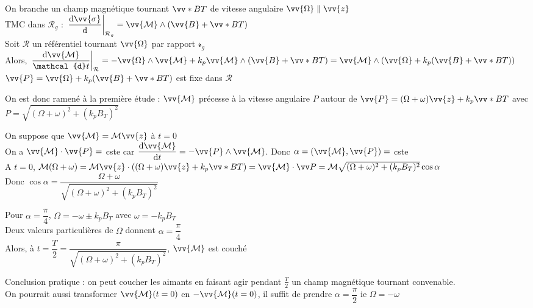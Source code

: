 ﻿\documentclass[a4paper]{article}
\begin{document}
On branche un champ magnétique tournant $\vv*{B}{T}$ de vitesse angulaire $\vv{\Omega}\parallel\vv{z}$\\
TMC dans $\mathcal{R}_g$ : $\left.\dfrac{\mathrm{d}\vv{\sigma}}{\mathrm{d}}\right|_{\mathcal{R}_g}=\vv{\mathcal{M}}\wedge(\vv{B}+\vv*{B}{T})$\\
Soit $\mathcal{R}$ un référentiel tournant $\vv{\Omega}$ par rapport $\mathcal{r}_g$\\
Alors, $\left.\dfrac{\mathrm{d}\vv{\mathcal{M}}}{\mathcal{d}t}\right|_{\mathcal{R}}=-\vv{\Omega}\wedge\vv{\mathcal{M}}+k_p\vv{\mathcal{M}}\wedge(\vv{B}+\vv*{B}{T})=\vv{\mathcal{M}}\wedge(\vv{\Omega}+k_p(\vv{B}+\vv*{B}{T}))$\\
$\vv{P}=\vv{\Omega}+k_p(\vv{B}+\vv*{B}{T})$ est fixe dans $\mathcal{R}$\par
On est donc ramené à la première étude : $\vv{\mathcal{M}}$ précesse à la vitesse angulaire $P$ autour de $\vv{P}=(\Omega+\omega)\vv{z}+k_p\vv*{B}{T}$ avec $P=\sqrt{(\Omega+\omega)^2+(k_pB_T)^2}$\par
{}
\par

On suppose que $\vv{\mathcal{M}}=\mathcal{M}\vv{z}$ à $t=0$\\
On a $\vv{\mathcal{M}}\cdot\vv{P}=$ cste car $\dfrac{\mathrm{d}\vv{\mathcal{M}}}{\mathrm{d}t}=-\vv{P}\wedge\vv{\mathcal{M}}$. Donc $\alpha=(\vv{\mathcal{M}},\vv{P})=$ cste\\
A $t=0$, $\mathcal{M}(\Omega+\omega)=\mathcal{M}\vv{z}\cdot((\Omega+\omega)\vv{z}+k_p\vv*{B}{T})=\vv {\mathcal{M}}\cdot\vv P=\mathcal{M} \sqrt{(\Omega+\omega)^2+(k_pB_T)^2}\cos\alpha$\\
Donc $\cos\alpha=\dfrac{\Omega+\omega}{\sqrt{(\Omega+\omega)^2+(k_pB_T)^2}}$

\begin{minipage}{0.5\linewidth}
	Pour $\alpha=\dfrac{\pi}{4}$, $\Omega=-\omega\pm k_pB_T$ avec $\omega=-k_pB_T$\\
	Deux valeurs particulières de $\Omega$ donnent $\alpha=\dfrac{\pi}{4}$\\
	Alors, à $t=\dfrac{T}{2}=\dfrac{\pi}{\sqrt{(\Omega+\omega)^2+(k_pB_T)^2}}$, $\vv{\mathcal{M}}$ est couché
\end{minipage}
\begin{minipage}{0.5\linewidth}
  \centering
\end{minipage}\par

Conclusion pratique : on peut coucher les aimants en faisant agir pendant $\frac{T}{2}$ un champ magnétique tournant convenable.\\
On pourrait aussi transformer $\vv{\mathcal{M}}(t=0)$ en $-\vv{\mathcal{M}}(t=0)$, il suffit de prendre $\alpha=\dfrac{\pi}{2}$ ie $\Omega=-\omega$
\end{document}
